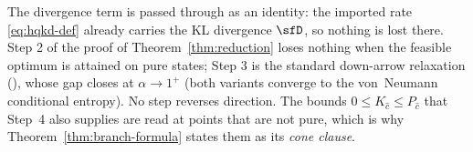 
\begin{remark}\label{rem:losses}
The divergence term is passed through as an identity: the imported rate
\eqref{eq:hqkd-def} already carries the KL divergence $\sfD$, so nothing
is lost there. Step 2 of the proof of Theorem~\ref{thm:reduction} loses
nothing when the feasible optimum is attained on pure states; Step 3 is the
standard down-arrow relaxation (), whose gap
closes at $\alpha\to1^+$ (both variants converge to the von~Neumann
conditional entropy). No step reverses direction. The bounds
$0\le K_{\hat c}\le P_{\hat c}$ that Step~4 also supplies are read at points
that are not pure, which is why Theorem~\ref{thm:branch-formula} states them
as its \emph{cone clause}.
\end{remark}
